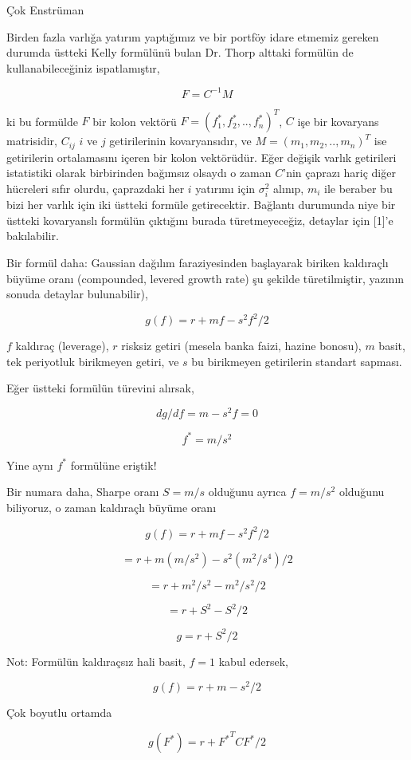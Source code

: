 \documentclass[12pt,fleqn]{article}\usepackage{../../common}
\begin{document}
Çok Enstrüman

Birden fazla varlığa yatırım yaptığımız ve bir portföy idare etmemiz
gereken durumda üstteki Kelly formülünü bulan Dr. Thorp alttaki formülün de
kullanabileceğiniz ispatlamıştır,

$$ F = C^{-1}M $$

ki bu formülde $F$ bir kolon vektörü $F = (f_1^*,f_2^*,..,f_n^*)^T$, $C$
işe bir kovaryans matrisidir, $C_{ij}$ $i$ ve $j$ getirilerinin
kovaryansıdır, ve $M = (m_1,m_2,..,m_n)^T$ ise getirilerin ortalamasını
içeren bir kolon vektörüdür. Eğer değişik varlık getirileri istatistiki
olarak birbirinden bağımsız olsaydı o zaman $C$'nin çaprazı hariç diğer
hücreleri sıfır olurdu, çaprazdaki her $i$ yatırımı için $\sigma_i^2$
alınıp, $m_i$ ile beraber bu bizi her varlık için iki üstteki formüle
getirecektir. Bağlantı durumunda niye bir üstteki kovaryanslı formülün
çıktığını burada türetmeyeceğiz, detaylar için [1]'e bakılabilir.

Bir formül daha: Gaussian dağılım faraziyesinden başlayarak biriken
kaldıraçlı büyüme oranı (compounded, levered growth rate) şu şekilde
türetilmiştir, yazının sonuda detaylar bulunabilir),

$$ g(f) = r + mf - s^2f^2 / 2 $$

$f$ kaldıraç (leverage), $r$ risksiz getiri (mesela banka faizi, hazine
bonosu), $m$ basit, tek periyotluk birikmeyen getiri, ve $s$ bu birikmeyen
getirilerin standart sapması. 

Eğer üstteki formülün türevini alırsak, 

$$ dg / df = m - s^2f = 0 $$

$$ f^* = m/s^2 $$

Yine aynı $f^*$ formülüne eriştik! 

Bir numara daha, Sharpe oranı $S = m/s$ olduğunu ayrıca $f=m/s^2$ olduğunu
biliyoruz, o zaman kaldıraçlı büyüme oranı

$$ g(f) = r + mf - s^2f^2 / 2 $$

$$  = r + m(m/s^2) - s^2(m^2/s^4) / 2 $$

$$  = r + m^2/s^2 - m^2/s^2 / 2 $$

$$  = r + S^2 - S^2/2 $$

$$ g = r +  S^2/2 $$

Not: Formülün kaldıraçsız hali basit, $f=1$ kabul edersek,

$$ g(f) = r + m - s^2/ 2 $$

Çok boyutlu ortamda 

$$ g(F^*) = r + {F^*}^TCF^* / 2 $$
\end{document}
